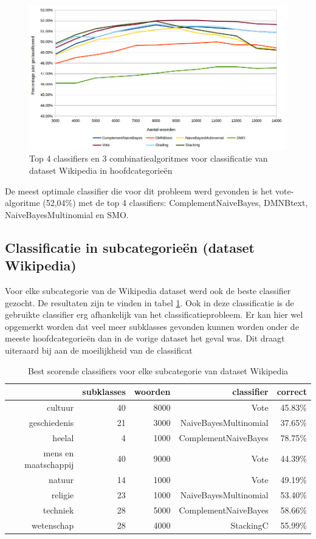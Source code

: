 \begin{figure}[h]
	\caption{Top 4 classifiers en 3 combinatiealgoritmes voor classificatie van dataset Wikipedia in hoofdcategorie\"en}
	\label{fig:clas-wiki}	
	\includegraphics[width=\textwidth]{fig/classificatie-20000-wiki.jpg}
\end{figure}

De meest optimale classifier die voor dit probleem werd gevonden is het vote-algoritme (52,04\%) met de top 4 classifiers: ComplementNaiveBayes, DMNBtext, NaiveBayesMultinomial en SMO.


\subsection{Classificatie in subcategorie\"en (dataset Wikipedia)}
Voor elke subcategorie van de Wikipedia dataset werd ook de beste classifier gezocht. De resultaten zijn te vinden in tabel \ref{tab:wiki-sub}. Ook in deze classificatie is de gebruikte classifier erg afhankelijk van het classificatieprobleem. Er kan hier wel opgemerkt worden dat veel meer subklasses gevonden kunnen worden onder de meeste hoofdcategorie\"en dan in de vorige dataset het geval was. Dit draagt uiteraard bij aan de moeilijkheid van de classificat

\begin{table}[htbp] 
\centering 
\caption{Best scorende classifiers voor elke subcategorie van dataset Wikipedia} 
\begin{tabular}{rrrrr} \toprule & subklasses & woorden & classifier & correct \\ \midrule cultuur & 40 & 8000 & Vote & 45.83\% \\ geschiedenis & 21 & 3000 & NaiveBayesMultinomial & 37.65\% \\ heelal & 4 & 1000 & ComplementNaiveBayes & 78.75\% \\ mens en maatschappij & 40 & 9000 & Vote & 44.39\% \\ natuur & 14 & 1000 & Vote & 49.19\% \\ religie & 23 & 1000 & NaiveBayesMultinomial & 53.40\% \\ techniek & 28 & 5000 & ComplementNaiveBayes & 58.66\% \\ wetenschap & 28 & 4000 & StackingC & 55.99\% \\ \bottomrule 
\end{tabular}%
\label{tab:wiki-sub}%
\end{table}%

